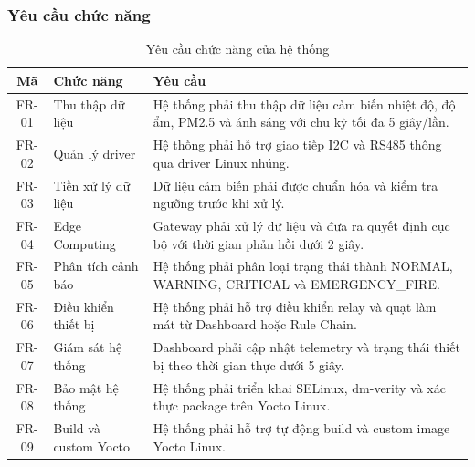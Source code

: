 \subsubsection{Yêu cầu chức năng}
\begin{table}[H]
\centering
\caption{Yêu cầu chức năng của hệ thống}
\label{tab:functional_requirements}

\begin{tabular}{|c|p{3.5cm}|p{8cm}|}
\hline
\textbf{Mã} & \textbf{Chức năng} & \textbf{Yêu cầu} \\ \hline

FR-01 &
Thu thập dữ liệu &
Hệ thống phải thu thập dữ liệu cảm biến nhiệt độ, độ ẩm, PM2.5 và ánh sáng với chu kỳ tối đa 5 giây/lần. \\ \hline

FR-02 &
Quản lý driver &
Hệ thống phải hỗ trợ giao tiếp I2C và RS485 thông qua driver Linux nhúng. \\ \hline

FR-03 &
Tiền xử lý dữ liệu &
Dữ liệu cảm biến phải được chuẩn hóa và kiểm tra ngưỡng trước khi xử lý. \\ \hline

FR-04 &
Edge Computing &
Gateway phải xử lý dữ liệu và đưa ra quyết định cục bộ với thời gian phản hồi dưới 2 giây. \\ \hline

FR-05 &
Phân tích cảnh báo &
Hệ thống phải phân loại trạng thái thành NORMAL, WARNING, CRITICAL và EMERGENCY\_FIRE. \\ \hline

FR-06 &
Điều khiển thiết bị &
Hệ thống phải hỗ trợ điều khiển relay và quạt làm mát từ Dashboard hoặc Rule Chain. \\ \hline

FR-07 &
Giám sát hệ thống &
Dashboard phải cập nhật telemetry và trạng thái thiết bị theo thời gian thực dưới 5 giây. \\ \hline

FR-08 &
Bảo mật hệ thống &
Hệ thống phải triển khai SELinux, dm-verity và xác thực package trên Yocto Linux. \\ \hline

FR-09 &
Build và custom Yocto &
Hệ thống phải hỗ trợ tự động build và custom image Yocto Linux. \\ \hline

\end{tabular}
\end{table}

